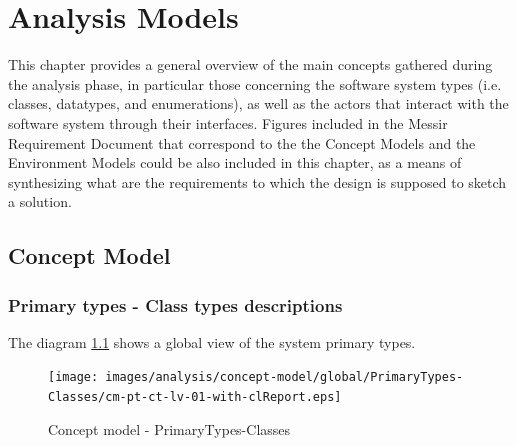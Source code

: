 \chapter{Analysis Models}
\label{chap:AM}

This chapter provides a general overview of the main concepts gathered during
the analysis phase, in particular those concerning the software system types
(i.e. classes, datatypes, and enumerations), as well as the actors that interact
with the software system through their interfaces. Figures included in the
Messir Requirement Document that correspond to the  the \glspl{Concept Model} and the \glspl{Environment
Model} could be also included in this chapter, as a means of synthesizing what
are the requirements to which the design is supposed to sketch a solution.




\section{Concept Model}
 




\subsection{Primary types - Class types descriptions}

The diagram \ref{fig:conceptClasses} shows a global view of the \msricrash
system primary types.

\begin{figure}[H]
\begin{center}
\texttt{[image: images/analysis/concept-model/global/PrimaryTypes-Classes/cm-pt-ct-lv-01-with-clReport.eps]}
\end{center}
\caption{Concept model - PrimaryTypes-Classes}
\label{fig:conceptClasses}
\end{figure}


